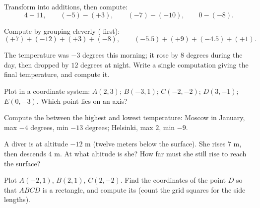 \begin{exercise}[$\star$]\label{exo:g7:negatives:5}
Transform into additions, then compute:
\[
4 - 11, \qquad
(-5) - (+3), \qquad
(-7) - (-10), \qquad
0 - (-8).
\]
\end{exercise}

\begin{exercise}[$\star$]\label{exo:g7:negatives:6}
Compute by grouping cleverly ( first):
\[
(+7) + (-12) + (+3) + (-8), \qquad
(-5.5) + (+9) + (-4.5) + (+1).
\]
\end{exercise}

\begin{exercise}[$\star$]\label{exo:g7:negatives:7}
The temperature was $-3$ degrees this morning; it rose by $8$ degrees
during the day, then dropped by $12$ degrees at night. Write a single
computation giving the final temperature, and compute it.
\end{exercise}

\begin{exercise}[$\star$]\label{exo:g7:negatives:8}
Plot in a coordinate system: $A(2, 3)$; $B(-3, 1)$; $C(-2, -2)$;
$D(3, -1)$; $E(0, -3)$. Which point lies on an axis?
\end{exercise}

\begin{exercise}[$\star\star$]\label{exo:g7:negatives:9}
Compute the  between the highest and lowest temperature:
Moscow in January, max $-4$ degrees, min $-13$ degrees; Helsinki, max
$2$, min $-9$.
\end{exercise}

\begin{exercise}[$\star\star$]\label{exo:g7:negatives:10}
A diver is at altitude $-12$ m (twelve meters below the surface). She
rises $7$ m, then descends $4$ m. At what altitude is she? How far
must she still rise to reach the surface?
\end{exercise}

\begin{exercise}[$\star\star$]\label{exo:g7:negatives:11}
Plot $A(-2, 1)$, $B(2, 1)$, $C(2, -2)$. Find the coordinates of the
point $D$ so that $ABCD$ is a rectangle, and compute its 
(count the grid squares for the side lengths).
\end{exercise}

